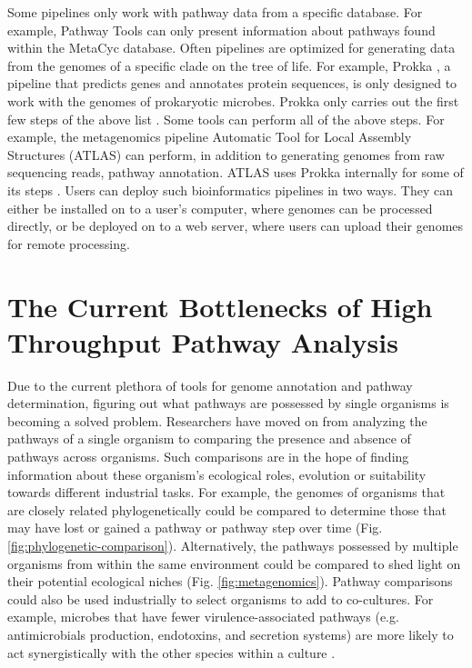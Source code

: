 Some pipelines only work with pathway data from a specific database. For example, Pathway Tools \cite{karp2002pathway} can only present information about pathways found within the MetaCyc \cite{karp2002metacyc} database. Often pipelines are optimized for generating data from the genomes of a specific clade on the tree of life. For example, Prokka \cite{seemann2014prokka}, a pipeline that predicts genes and annotates protein sequences, is only designed to work with the genomes of prokaryotic microbes. Prokka only carries out the first few steps of the above list \cite{seemann2014prokka}. Some tools can perform all of the above steps. For example, the metagenomics pipeline Automatic Tool for Local Assembly Structures (ATLAS) \cite{white2017atlas,kieser2019atlas} can perform, in addition to generating genomes from raw sequencing reads, pathway annotation. ATLAS uses Prokka internally for some of its steps \cite{white2017atlas,kieser2019atlas}. Users can deploy such bioinformatics pipelines in two ways. They can either be installed on to a user's computer, where genomes can be processed directly, or be deployed on to a web server, where users can upload their genomes for remote processing.


\section{The Current Bottlenecks of High Throughput Pathway Analysis}

Due to the current plethora of tools for genome annotation and pathway determination, figuring out what pathways are possessed by single organisms is becoming a solved problem. Researchers have moved on from analyzing the pathways of a single organism to comparing the presence and absence of pathways across organisms. Such comparisons are in the hope of finding information about these organism's ecological roles, evolution or suitability towards different industrial tasks. For example, the genomes of organisms that are closely related phylogenetically could be compared to determine those that may have lost or gained a pathway or pathway step over time (Fig. \ref{fig:phylogenetic-comparison}). Alternatively, the pathways possessed by multiple organisms from within the same environment could be compared to shed light on their potential ecological niches (Fig. \ref{fig:metagenomics}). Pathway comparisons could also be used industrially to select organisms to add to co-cultures. For example, microbes that have fewer virulence-associated pathways (e.g. antimicrobials production, endotoxins, and secretion systems) are more likely to act synergistically with the other species within a culture \cite{mamat2015detoxifying}.

